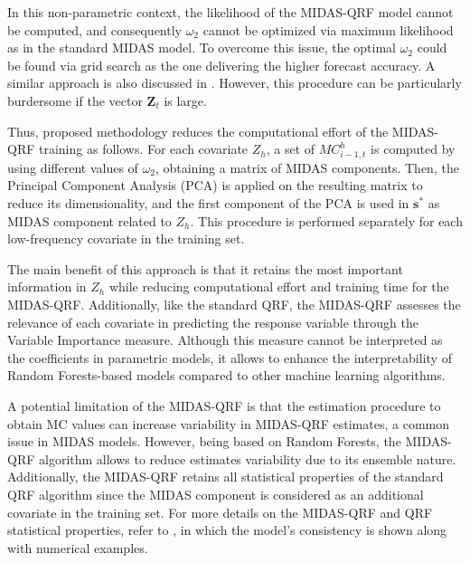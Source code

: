 \vspace{0.15in}

\noindent In this non-parametric context, the likelihood of the MIDAS-QRF model cannot be computed, and consequently $\omega_2$ cannot be optimized via maximum likelihood as in the standard MIDAS model.
To overcome this issue, the optimal $\omega_2$ could be found via grid search as the one delivering the higher forecast accuracy. A similar approach is also discussed in \cite{candila2023mixed}. However, this procedure can be particularly burdersome if the vector $\textbf{Z}_t$ is large. \vspace{0.15in}

\noindent Thus, proposed methodology reduces the computational effort of the MIDAS-QRF training as follows. For each covariate $Z_h$, a set of $MC_{i-1,t}^h$ is computed by using different values of $\omega_2$, obtaining a matrix of MIDAS components. Then, the Principal Component Analysis (PCA) is applied on the resulting matrix to reduce its dimensionality, and the first component of the PCA is used in $\mathbf{s}^*$ as MIDAS component related to $Z_h$.
This procedure is performed separately for each low-frequency covariate in the training set.
\vspace{0.15in}

\noindent The main benefit of this approach is that it retains the most important information in $Z_h$ while reducing computational effort and training time for the MIDAS-QRF. Additionally, like the standard QRF, the MIDAS-QRF assesses the relevance of each covariate in predicting the response variable through the Variable Importance measure. Although this measure cannot be interpreted as the coefficients in parametric models, it allows to enhance the interpretability of Random Forests-based models compared to other machine learning algorithms.
\vspace{0.15in}

\noindent A potential limitation of the MIDAS-QRF is that the estimation procedure to obtain MC values can increase variability in MIDAS-QRF estimates, a common issue in MIDAS models. However, being based on Random Forests, the MIDAS-QRF algorithm allows to reduce estimates variability due to its ensemble nature. Additionally, the MIDAS-QRF retains all statistical properties of the standard QRF algorithm since the MIDAS component is considered as an additional covariate in the training set. For more details on the MIDAS-QRF and QRF statistical properties, refer to \cite{meinshausen2006quantile}, in which the model's consistency is shown along with numerical examples.


